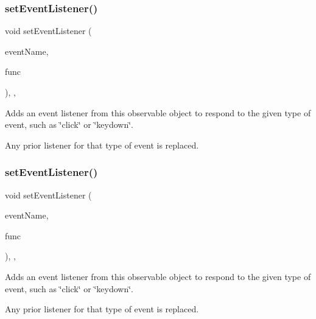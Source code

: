 \subsubsection{\texorpdfstring{set\+Event\+Listener()}{setEventListener()}\hspace{0.1cm}{\footnotesize\ttfamily [1/2]}}
{\footnotesize\ttfamily void set\+Event\+Listener (\begin{DoxyParamCaption}\item[{const std\+::string \&}]{event\+Name,  }\item[{G\+Event\+Listener}]{func }\end{DoxyParamCaption})\hspace{0.3cm}{\ttfamily [protected]}, {\ttfamily [virtual]}, {\ttfamily [inherited]}}



Adds an event listener from this observable object to respond to the given type of event, such as \char`\"{}click\char`\"{} or \char`\"{}keydown\char`\"{}. 

Any prior listener for that type of event is replaced. \mbox{\label{classGObservable_abac4cb9f9e626e010e87f5d91573c8a5}} 
\subsubsection{\texorpdfstring{set\+Event\+Listener()}{setEventListener()}\hspace{0.1cm}{\footnotesize\ttfamily [2/2]}}
{\footnotesize\ttfamily void set\+Event\+Listener (\begin{DoxyParamCaption}\item[{const std\+::string \&}]{event\+Name,  }\item[{G\+Event\+Listener\+Void}]{func }\end{DoxyParamCaption})\hspace{0.3cm}{\ttfamily [protected]}, {\ttfamily [virtual]}, {\ttfamily [inherited]}}



Adds an event listener from this observable object to respond to the given type of event, such as \char`\"{}click\char`\"{} or \char`\"{}keydown\char`\"{}. 

Any prior listener for that type of event is replaced. \mbox{\label{classGObservable_afa388d69c33c718cf035774604065604}} 
